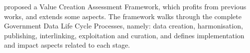  proposed a Value Creation Assessment Framework, which profits from previous works, and extends some aspects.
The framework walks through the complete Government Data Life Cycle Processes, namely: data creation, harmonisation, publishing, interlinking, exploitation and curation, and defines implementation and impact aspects related to each stage.






